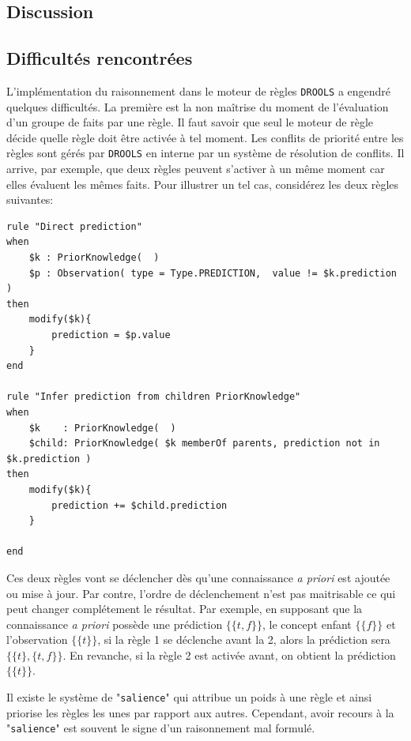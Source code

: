 \begin{refsegment}
\cleardoublepage


\section{Discussion}
\subsection{Difficultés rencontrées}
L'implémentation du raisonnement dans le moteur de règles \texttt{DROOLS} a engendré quelques difficultés. La première est la non maîtrise du moment de l'évaluation d'un groupe de faits par une règle. Il faut savoir que seul le moteur de règle décide quelle règle doit être activée à tel moment. Les conflits de priorité entre les règles sont gérés par \texttt{DROOLS} en interne par un système de résolution de conflits. Il arrive, par exemple, que deux règles peuvent s'activer à un même moment car elles évaluent les mêmes faits. Pour illustrer un tel cas, considérez les deux règles suivantes:

\begin{lstlisting}[style=drl-style,caption=conflit]
rule "Direct prediction"
when
	$k : PriorKnowledge(  )
	$p : Observation( type = Type.PREDICTION,  value != $k.prediction )
then
	modify($k){
		prediction = $p.value
	}
end

rule "Infer prediction from children PriorKnowledge"
when
	$k    : PriorKnowledge(  )
	$child: PriorKnowledge( $k memberOf parents, prediction not in $k.prediction )
then
	modify($k){
		prediction += $child.prediction
	}

end
\end{lstlisting}

Ces deux règles vont se déclencher dès qu'une connaissance \textit{a priori} est ajoutée ou mise à jour. Par contre, l'ordre de déclenchement n'est pas maitrisable ce qui peut changer complétement le résultat. Par exemple, en supposant que la connaissance \textit{a priori}  possède une prédiction $\{\{t,f\}\}$, le concept enfant  $\{\{f\}\}$ et l'observation $\{\{t\}\}$, si la règle 1 se déclenche avant la 2, alors la prédiction sera $\{\{t\},\{t,f\}\}$. En revanche, si la règle 2 est activée avant, on obtient la prédiction  $\{\{t\}\}$.

Il existe le système de "\texttt{salience}" qui attribue un poids à une règle et ainsi priorise les règles les unes par rapport aux autres.  Cependant, avoir recours à la "\texttt{salience}" est souvent le signe d'un raisonnement mal formulé.


\end{refsegment}
